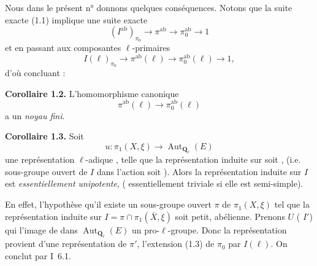 \documentclass[11pt,a4paper]{article}
\begin{document}
Nous \ill{} dans le présent n° donnons quelques conséquences. Notons que la suite exacte (1.1) implique une suite exacte
\[
(I^{\mathrm{ab}})_{\pi_0} \longrightarrow \pi^{\mathrm{ab}} \longrightarrow \pi_0^{\mathrm{ab}} \longrightarrow 1
\]
\struck{\ill{}} et en passant aux composantes $\ell$-primaires
\[
I(\ell)_{\pi_0} \longrightarrow \pi^{\mathrm{ab}}(\ell) \longrightarrow \pi_0^{\mathrm{ab}}(\ell) \longrightarrow 1 ,
\]
d'où \ill{} concluant :

\textbf{Corollaire 1.2.} L'homomorphisme  canonique
\[
\pi^{\mathrm{ab}}(\ell) \longrightarrow \pi_0^{\mathrm{ab}}(\ell)
\]
\struck{\ill{}} a un \emph{noyau fini}.


\textbf{Corollaire 1.3.} Soit
\[
u : \pi_1(X,\xi) \longrightarrow \operatorname{Aut}_{\mathbf{Q}_\ell}(E)
\]
une représentation $\ell$-adique \struck{\ill{}}, telle que la représentation induite sur  \struck{\ill{}} soit  ,   (i.e.  sous-groupe ouvert de $I$ dans l'action soit  ). Alors la représentation induite sur $I$ est \emph{essentiellement unipotente}, \struck{\ill{}} ( essentiellement triviale si elle est semi-simple).

En effet, \struck{\ill{}} l'hypothèse \struck{\ill{} \ill{} \ill{}} \add{\ill{} \ill{}}  qu'il existe un sous-groupe \struck{\ill{} \ill{} \ill{} \ill{}} ouvert $\pi$ de $\pi_1(X,\xi)$ tel que la représentation induite sur $I = \pi \cap \pi_1(\bar X, \xi)$ soit \ill{} \ill{} petit, \ill{} \ill{}  abélienne. Prenons $U$ \ill{} (\ill{} $I'$) qui \struck{\ill{} \ill{} \ill{} \ill{}} \ill{} l'image de  dans $\operatorname{Aut}_{\mathbf{Q}_\ell}(E)$ \ill{} un pro-$\ell$-groupe. Donc la représentation  provient d'une représentation de $\pi'$, \struck{\ill{}} l'extension (1.3) de $\pi_0$ par $I(\ell)$. On conclut par I~6.1.
\end{document}
